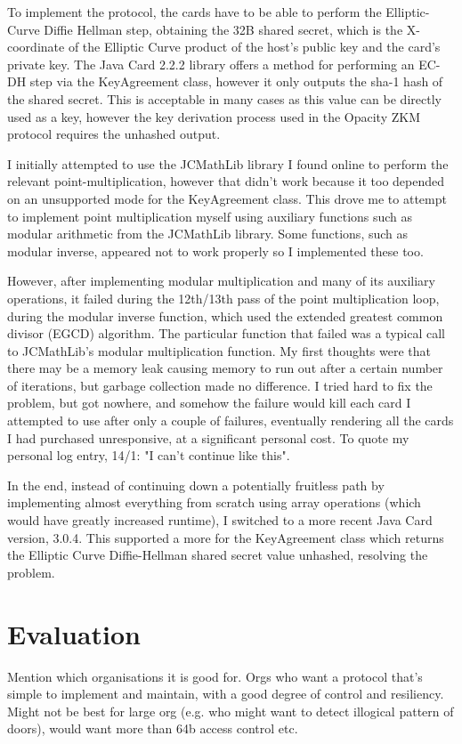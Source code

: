 \documentclass[12pt]{article}
\begin{document}
To implement the protocol, the cards have to be able to perform the Elliptic-Curve Diffie Hellman step, obtaining the 32B shared secret, which is the X-coordinate of the Elliptic Curve product of the host's public key and the card's private key. The Java Card 2.2.2 library offers a method for performing an EC-DH step via the KeyAgreement class, however it only outputs the sha-1 hash of the shared secret. This is acceptable in many cases as this value can be directly used as a key, however the key derivation process used in the Opacity ZKM protocol requires the unhashed output.

I initially attempted to use the JCMathLib library I found online to perform the relevant point-multiplication, however that didn't work because it too depended on an unsupported mode for the KeyAgreement class. This drove me to attempt to implement point multiplication myself using auxiliary functions such as modular arithmetic from the JCMathLib library. Some functions, such as modular inverse, appeared not to work properly so I implemented these too.

However, after implementing modular multiplication and many of its auxiliary operations, it failed during the 12th/13th pass of the point multiplication loop, during the modular inverse function, which used the extended greatest common divisor (EGCD) algorithm. The particular function that failed was a typical call to JCMathLib's modular multiplication function. My first thoughts were that there may be a memory leak causing memory to run out after a certain number of iterations, but garbage collection made no difference. I tried hard to fix the problem, but got nowhere, and somehow the failure would kill each card I attempted to use after only a couple of failures, eventually rendering all the cards I had purchased unresponsive, at a significant personal cost. To quote my personal log entry, 14/1: "I can't continue like this".


In the end, instead of continuing down a potentially fruitless path by implementing almost everything from scratch using array operations (which would have greatly increased runtime), I  switched to a more recent Java Card version, 3.0.4. This supported a more for the KeyAgreement class which returns the Elliptic Curve Diffie-Hellman shared secret value unhashed, resolving the problem.


\pagebreak
\section{Evaluation}
Mention which organisations it is good for. Orgs who want a protocol that's simple to implement and maintain, with a good degree of control and resiliency. Might not be best for large org (e.g. who might want to detect illogical pattern of doors), would want more than 64b access control etc.
\end{document}
